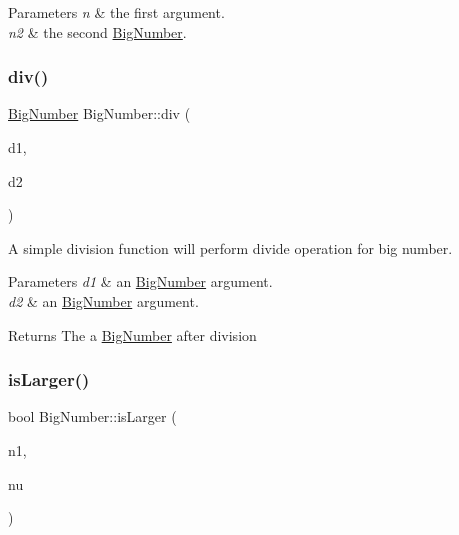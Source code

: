 \begin{DoxyParams}{Parameters}
{\em n} & the first argument. \\
\hline
{\em n2} & the second \mbox{\hyperlink{class_big_number}{Big\+Number}}. \\
\hline
\end{DoxyParams}
\mbox{\label{class_big_number_a645d17af03f7c4c9ad786fd8e2eba3ca}} 
\subsubsection{\texorpdfstring{div()}{div()}}
{\footnotesize\ttfamily \mbox{\hyperlink{class_big_number}{Big\+Number}} Big\+Number\+::div (\begin{DoxyParamCaption}\item[{\mbox{\hyperlink{class_big_number}{Big\+Number}}}]{d1,  }\item[{\mbox{\hyperlink{class_big_number}{Big\+Number}}}]{d2 }\end{DoxyParamCaption})}



A simple division function will perform divide operation for big number. 


\begin{DoxyParams}{Parameters}
{\em d1} & an \mbox{\hyperlink{class_big_number}{Big\+Number}} argument. \\
\hline
{\em d2} & an \mbox{\hyperlink{class_big_number}{Big\+Number}} argument. \\
\hline
\end{DoxyParams}
\begin{DoxyReturn}{Returns}
The a \mbox{\hyperlink{class_big_number}{Big\+Number}} after division 
\end{DoxyReturn}
\mbox{\label{class_big_number_a782520e52d7a51cb2e2b0f35fd9c92a3}} 
\subsubsection{\texorpdfstring{isLarger()}{isLarger()}}
{\footnotesize\ttfamily bool Big\+Number\+::is\+Larger (\begin{DoxyParamCaption}\item[{\mbox{\hyperlink{class_big_number}{Big\+Number}}}]{n1,  }\item[{\mbox{\hyperlink{class_big_number}{Big\+Number}}}]{nu }\end{DoxyParamCaption})}



